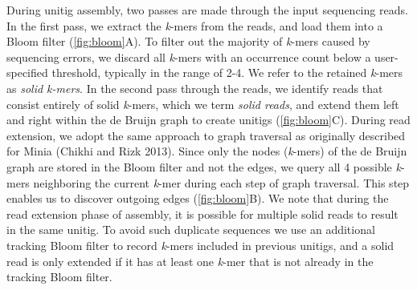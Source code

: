\documentclass[
  12pt,
  oneside,
  openany]{book}
\begin{document}
During unitig assembly, two passes are made through the input sequencing reads. In the first pass, we extract the \emph{k}-mers from the reads, and load them into a Bloom filter (\cref{fig:bloom}A). To filter out the majority of \emph{k}-mers caused by sequencing errors, we discard all \emph{k}-mers with an occurrence count below a user-specified threshold, typically in the range of 2-4. We refer to the retained \emph{k}-mers as \emph{solid k-mers}. In the second pass through the reads, we identify reads that consist entirely of solid \emph{k}-mers, which we term \emph{solid reads}, and extend them left and right within the de Bruijn graph to create unitigs (\cref{fig:bloom}C). During read extension, we adopt the same approach to graph traversal as originally described for Minia (Chikhi and Rizk 2013). Since only the nodes (\emph{k}-mers) of the de Bruijn graph are stored in the Bloom filter and not the edges, we query all 4 possible \emph{k}-mers neighboring the current \emph{k}-mer during each step of graph traversal. This step enables us to discover outgoing edges (\cref{fig:bloom}B). We note that during the read extension phase of assembly, it is possible for multiple solid reads to result in the same unitig. To avoid such duplicate sequences we use an additional tracking Bloom filter to record \emph{k}-mers included in previous unitigs, and a solid read is only extended if it has at least one \emph{k}-mer that is not already in the tracking Bloom filter.
\end{document}
